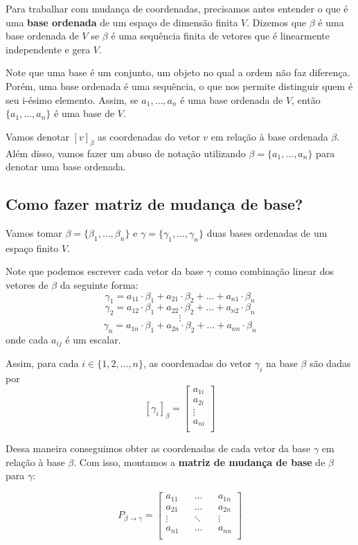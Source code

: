 \documentclass[12pt,a4paper]{article}
\begin{document}
Para trabalhar com mudança de coordenadas, precisamos antes entender o que é uma \textbf{base ordenada} de um espaço de dimensão finita $V$. Dizemos que $\beta$ é uma base ordenada de $V$ se $\beta$ é uma sequência finita de vetores que é linearmente independente e gera $V$.

Note que uma base é um conjunto, um objeto no qual a ordem não faz diferença. Porém, uma base ordenada é uma sequência, o que nos permite distinguir quem é seu i-ésimo elemento. Assim, se $a_1, \ldots, a_n$ é uma base ordenada de $V$, então $\{ a_1, \ldots, a_n \}$ é uma base de $V$.

Vamos denotar $[ v ]_\beta$ as coordenadas do vetor $v$ em relação à base ordenada $\beta$. Além disso, vamos fazer um abuso de notação utilizando $\beta = \{ a_1, \ldots, a_n \}$ para denotar uma base ordenada.

\subsection{Como fazer matriz de mudança de base?}

Vamos tomar $\beta = \{ \beta_1, \ldots, \beta_n \}$ e $\gamma = \{ \gamma_1, \ldots, \gamma_n \}$ duas bases ordenadas de um espaço finito $V$.

Note que podemos escrever cada vetor da base $\gamma$ como combinação linear dos vetores de $\beta$ da seguinte forma:
$$\gamma_1 = a_{11}\cdot \beta_1 + a_{21}\cdot \beta_2 + \ldots + a_{n1}\cdot \beta_n$$
$$\gamma_2 = a_{12}\cdot \beta_1 + a_{22}\cdot \beta_2 + \ldots + a_{n2}\cdot \beta_n$$
$$\vdots$$
$$\gamma_n = a_{1n}\cdot \beta_1 + a_{2n}\cdot \beta_2 + \ldots + a_{nn}\cdot \beta_n$$
onde cada $a_{ij}$ é um escalar.

Assim, para cada $i \in \{1, 2, \ldots, n \}$, as coordenadas do vetor $\gamma_i$ na base $\beta$ são dadas por
$$
[\gamma_i]_\beta =
\begin{bmatrix} 
a_{1i} \\
a_{2i} \\
\vdots \\
a_{ni} \\
\end{bmatrix}
$$

Dessa maneira conseguimos obter as coordenadas de cada vetor da base $\gamma$ em relação à base $\beta$. Com isso, montamos a \textbf{matriz de mudança de base} de $\beta$ para $\gamma$:

$$
P_{\beta \to \gamma} =
\begin{bmatrix} 
a_{11} && \ldots && a_{1n} \\
a_{21} && \ldots && a_{2n} \\
\vdots && \ddots && \vdots \\
a_{n1} && \ldots && a_{nn} \\
\end{bmatrix}
$$
\end{document}

